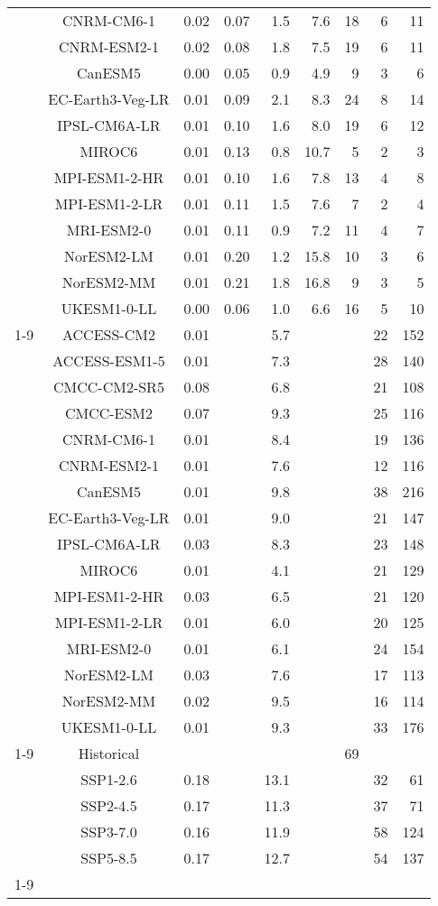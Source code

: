 \begin{table*}[t]
\begin{tabular}{c|c|rr|rr|rrr}
 & CNRM-CM6-1 & 0.02 & 0.07 & 1.5 & 7.6 & 18 & 6 & 11 \\
 & CNRM-ESM2-1 & 0.02 & 0.08 & 1.8 & 7.5 & 19 & 6 & 11 \\
 & CanESM5 & 0.00 & 0.05 & 0.9 & 4.9 & 9 & 3 & 6 \\
 & EC-Earth3-Veg-LR & 0.01 & 0.09 & 2.1 & 8.3 & 24 & 8 & 14 \\
 & IPSL-CM6A-LR & 0.01 & 0.10 & 1.6 & 8.0 & 19 & 6 & 12 \\
 & MIROC6 & 0.01 & 0.13 & 0.8 & 10.7 & 5 & 2 & 3 \\
 & MPI-ESM1-2-HR & 0.01 & 0.10 & 1.6 & 7.8 & 13 & 4 & 8 \\
 & MPI-ESM1-2-LR & 0.01 & 0.11 & 1.5 & 7.6 & 7 & 2 & 4 \\
 & MRI-ESM2-0 & 0.01 & 0.11 & 0.9 & 7.2 & 11 & 4 & 7 \\
 & NorESM2-LM & 0.01 & 0.20 & 1.2 & 15.8 & 10 & 3 & 6 \\
 & NorESM2-MM & 0.01 & 0.21 & 1.8 & 16.8 & 9 & 3 & 5 \\
 & UKESM1-0-LL & 0.00 & 0.06 & 1.0 & 6.6 & 16 & 5 & 10 \\
\cline{1-9}
\multirow[c]{16}{*}{Scenario uncertainty} & ACCESS-CM2 & 0.01 &  & 5.7 &  &  & 22 & 152 \\
 & ACCESS-ESM1-5 & 0.01 &  & 7.3 &  &  & 28 & 140 \\
 & CMCC-CM2-SR5 & 0.08 &  & 6.8 &  &  & 21 & 108 \\
 & CMCC-ESM2 & 0.07 &  & 9.3 &  &  & 25 & 116 \\
 & CNRM-CM6-1 & 0.01 &  & 8.4 &  &  & 19 & 136 \\
 & CNRM-ESM2-1 & 0.01 &  & 7.6 &  &  & 12 & 116 \\
 & CanESM5 & 0.01 &  & 9.8 &  &  & 38 & 216 \\
 & EC-Earth3-Veg-LR & 0.01 &  & 9.0 &  &  & 21 & 147 \\
 & IPSL-CM6A-LR & 0.03 &  & 8.3 &  &  & 23 & 148 \\
 & MIROC6 & 0.01 &  & 4.1 &  &  & 21 & 129 \\
 & MPI-ESM1-2-HR & 0.03 &  & 6.5 &  &  & 21 & 120 \\
 & MPI-ESM1-2-LR & 0.01 &  & 6.0 &  &  & 20 & 125 \\
 & MRI-ESM2-0 & 0.01 &  & 6.1 &  &  & 24 & 154 \\
 & NorESM2-LM & 0.03 &  & 7.6 &  &  & 17 & 113 \\
 & NorESM2-MM & 0.02 &  & 9.5 &  &  & 16 & 114 \\
 & UKESM1-0-LL & 0.01 &  & 9.3 &  &  & 33 & 176 \\
\cline{1-9}
\multirow[c]{5}{*}{Model uncertainty} & Historical &  &  &  &  & 69 &  &  \\
 & SSP1-2.6 & 0.18 &  & 13.1 &  &  & 32 & 61 \\
 & SSP2-4.5 & 0.17 &  & 11.3 &  &  & 37 & 71 \\
 & SSP3-7.0 & 0.16 &  & 11.9 &  &  & 58 & 124 \\
 & SSP5-8.5 & 0.17 &  & 12.7 &  &  & 54 & 137 \\
\cline{1-9}
\bottomrule
\end{tabular}
\end{table*}
